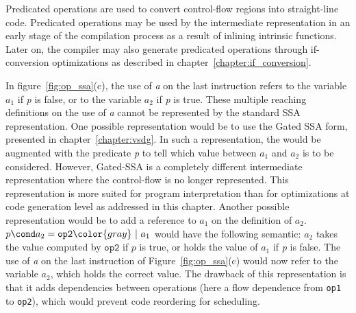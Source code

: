 
Predicated operations are used to convert control-flow regions into
straight-line code. Predicated operations may be used by the intermediate
representation in an early stage of the compilation process as a result of inlining intrinsic functions. Later on, the compiler may
also generate predicated operations through if-conversion optimizations
as described in chapter~\ref{chapter:if_conversion}.


In figure~\ref{fig:op_ssa}(c), the use of \textit{a} on the last
instruction refers to the variable ${a_1}$ if \textit{p} is false, or
to the variable ${a_2}$ if \textit{p} is true. These multiple
reaching definitions on the use of \textit{a} cannot be represented by
the standard SSA representation.
%
One possible representation would be to use the Gated SSA form,
presented in chapter~\ref{chapter:vsdg}. In such a representation, the
\phifun would be augmented with the predicate \textit{p} to tell
which value between ${a_1}$ and ${a_2}$ is to be
considered. However, Gated-SSA is a completely different intermediate
representation where the control-flow is no longer represented. This
representation is more suited for program interpretation than for optimizations at code generation level as addressed in this chapter.
%
Another possible representation would be to add a reference to ${a_1}$
 on the definition of ${a_2}$. $p\cond a_2=\texttt{op2} {\color{gray}~|~a_1}$ 
would have the following semantic: ${a_2}$ takes the value computed by $\texttt{op2}$ if $p$ is true, or holds
the value of ${a_1}$ if \textit{p} is {false}. The use of \textit{a} on the last instruction of Figure~\ref{fig:op_ssa}(c)
would now refer to the variable ${a_2}$, which holds the correct
value. The drawback of this representation is that it adds
dependencies between operations (here a flow dependence from \texttt{op1} to \texttt{op2}), which would prevent code reordering
for scheduling. 

